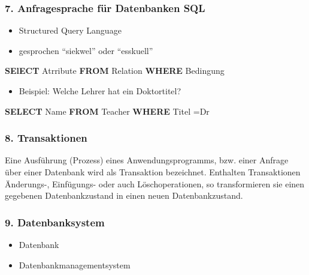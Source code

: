 \documentclass[
  11pt,
  a4paper,
  DIV=11,
  numbers=noendperiod]{scrartcl}
\newenvironment{Shaded}{\begin{snugshade}}{\end{snugshade}}
\newcommand{\KeywordTok}[1]{\textcolor[rgb]{0.00,0.23,0.31}{\textbf{#1}}}
\newcommand{\NormalTok}[1]{\textcolor[rgb]{0.00,0.23,0.31}{#1}}
\newcommand{\OperatorTok}[1]{\textcolor[rgb]{0.37,0.37,0.37}{#1}}
\newcommand{\StringTok}[1]{\textcolor[rgb]{0.13,0.47,0.30}{#1}}
\providecommand{\tightlist}{%
  \setlength{\itemsep}{0pt}\setlength{\parskip}{0pt}}\usepackage{longtable,booktabs,array}
\begin{document}
\subsubsection{7. Anfragesprache für Datenbanken
SQL}\label{anfragesprache-fuxfcr-datenbanken-sql}

\begin{itemize}
\tightlist
\item
  Structured Query Language
\item
  gesprochen ``siekwel'' oder ``esskuell''
\end{itemize}

\begin{Shaded}
\begin{Highlighting}[numbers=left,,]
\KeywordTok{SElECT}\NormalTok{ Atrribute}
\KeywordTok{FROM}\NormalTok{ Relation }
\KeywordTok{WHERE}\NormalTok{ Bedingung}
\end{Highlighting}
\end{Shaded}

\begin{itemize}
\tightlist
\item
  Beispiel: Welche Lehrer hat ein Doktortitel?
\end{itemize}

\begin{Shaded}
\begin{Highlighting}[numbers=left,,]
\KeywordTok{SELECT}\NormalTok{ Name}
\KeywordTok{FROM}\NormalTok{  Teacher}
\KeywordTok{WHERE}\NormalTok{ Titel }\OperatorTok{=}\StringTok{\textquotesingle{}Dr\textquotesingle{}}
\end{Highlighting}
\end{Shaded}

\subsubsection{8. Transaktionen}\label{transaktionen}

Eine Ausführung (Prozess) eines Anwendungsprogramms, bzw. einer Anfrage
über einer Datenbank wird als Transaktion bezeichnet. Enthalten
Transaktionen Änderungs-, Einfügungs- oder auch Löschoperationen, so
transformieren sie einen gegebenen Datenbankzustand in einen neuen
Datenbankzustand.

\subsubsection{9. Datenbanksystem}\label{datenbanksystem}

\begin{itemize}
\tightlist
\item
  Datenbank
\item
  Datenbankmanagementsystem
\end{itemize}
\end{document}
